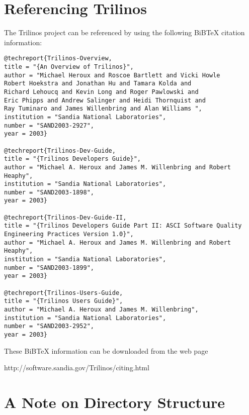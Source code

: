 
\section{Referencing Trilinos}
\label{sec:referencing}

The Trilinos project can be referenced by using the following BiBTeX
citation information:
\begin{verbatim}
@techreport{Trilinos-Overview,
title = "{An Overview of Trilinos}",
author = "Michael Heroux and Roscoe Bartlett and Vicki Howle
Robert Hoekstra and Jonathan Hu and Tamara Kolda and
Richard Lehoucq and Kevin Long and Roger Pawlowski and
Eric Phipps and Andrew Salinger and Heidi Thornquist and
Ray Tuminaro and James Willenbring and Alan Williams ",
institution = "Sandia National Laboratories",
number = "SAND2003-2927",
year = 2003}

@techreport{Trilinos-Dev-Guide,
title = "{Trilinos Developers Guide}",
author = "Michael A. Heroux and James M. Willenbring and Robert Heaphy",
institution = "Sandia National Laboratories",
number = "SAND2003-1898",
year = 2003}

@techreport{Trilinos-Dev-Guide-II,
title = "{Trilinos Developers Guide Part II: ASCI Software Quality
Engineering Practices Version 1.0}",
author = "Michael A. Heroux and James M. Willenbring and Robert Heaphy",
institution = "Sandia National Laboratories",
number = "SAND2003-1899",
year = 2003}

@techreport{Trilinos-Users-Guide,
title = "{Trilinos Users Guide}",
author = "Michael A. Heroux and James M. Willenbring",
institution = "Sandia National Laboratories",
number = "SAND2003-2952",
year = 2003}
\end{verbatim}
These BiBTeX information can be downloaded from the web page

\begin{verb}
http://software.sandia.gov/Trilinos/citing.html
\end{verb}


\section{A Note on Directory Structure}
\label{sec:into_note}

